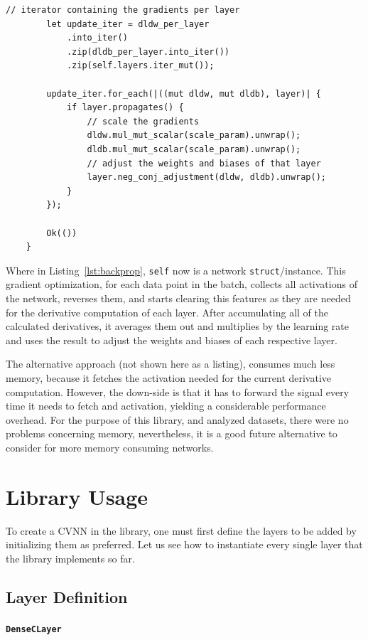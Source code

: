 \begin{lstlisting}[label=lst:backprop, caption=Overview of the gradient optimization algorithm (using back-propagation) implementation in the Renplex library  using Rust., label=lst:grad_opt]
		// iterator containing the gradients per layer
		let update_iter = dldw_per_layer
			.into_iter()
			.zip(dldb_per_layer.into_iter())
			.zip(self.layers.iter_mut());
		
		update_iter.for_each(|((mut dldw, mut dldb), layer)| {
			if layer.propagates() {
				// scale the gradients
				dldw.mul_mut_scalar(scale_param).unwrap();
				dldb.mul_mut_scalar(scale_param).unwrap();
				// adjust the weights and biases of that layer
				layer.neg_conj_adjustment(dldw, dldb).unwrap();
			}
		});
		
		Ok(())
	}
\end{lstlisting}
Where in Listing~\ref{lst:backprop}, \texttt{self} now is a network \texttt{struct}/instance. This gradient optimization, for each data point in the batch, collects all activations of the network, reverses them, and starts clearing this features as they are needed for the derivative computation of each layer. After accumulating all of the calculated derivatives, it averages them out and multiplies by the learning rate and uses the result to adjust the weights and biases of each respective layer.

The alternative approach (not shown here as a listing), consumes much less memory, because it fetches the activation needed for the current derivative computation. However, the down-side is that it has to forward the signal every time it needs to fetch and activation, yielding a considerable performance overhead. For the purpose of this library, and analyzed datasets, there were no problems concerning memory, nevertheless, it is a good future alternative to consider for more memory consuming networks.

\section{Library Usage}

To create a CVNN in the library, one must first define the layers to be added by initializing them as preferred. Let us see how to instantiate every single layer that the library implements so far.

\subsection{Layer Definition}
\paragraph{\texttt{DenseCLayer}}

